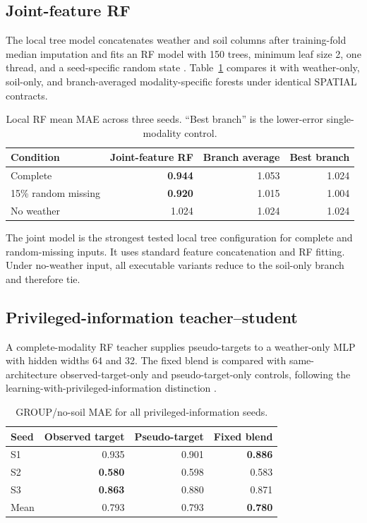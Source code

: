 \documentclass[runningheads]{venue/lncs/llncs}
\begin{document}
\subsection{Joint-feature RF}

The local tree model concatenates weather and soil columns after training-fold median imputation and fits an RF model with 150 trees, minimum leaf size 2, one thread, and a seed-specific random state \cite{Breiman2001RandomForests}. Table~\ref{tab:rf} compares it with weather-only, soil-only, and branch-averaged modality-specific forests under identical SPATIAL contracts.

\begin{table}[h]
\centering
\caption{Local RF mean MAE across three seeds. ``Best branch'' is the lower-error single-modality control.}
\label{tab:rf}
\small
\begin{tabular}{lrrr}
\toprule
Condition & Joint-feature RF & Branch average & Best branch\\
\midrule
Complete & \textbf{0.944} & 1.053 & 1.024\\
15\% random missing & \textbf{0.920} & 1.015 & 1.004\\
No weather & 1.024 & 1.024 & 1.024\\
\bottomrule
\end{tabular}
\end{table}

The joint model is the strongest tested local tree configuration for complete and random-missing inputs. It uses standard feature concatenation and RF fitting. Under no-weather input, all executable variants reduce to the soil-only branch and therefore tie.

\subsection{Privileged-information teacher--student}\label{sec:pi}

A complete-modality RF teacher supplies pseudo-targets to a weather-only MLP with hidden widths 64 and 32. The fixed blend is compared with same-architecture observed-target-only and pseudo-target-only controls, following the learning-with-privileged-information distinction \cite{LopezPaz2016GeneralizedDistillation}.

\begin{table}[h]
\centering
\caption{GROUP/no-soil MAE for all privileged-information seeds.}
\small
\begin{tabular}{lrrr}
\toprule
Seed & Observed target & Pseudo-target & Fixed blend\\
\midrule
S1 & 0.935 & 0.901 & \textbf{0.886}\\
S2 & \textbf{0.580} & 0.598 & 0.583\\
S3 & \textbf{0.863} & 0.880 & 0.871\\
\midrule
Mean & 0.793 & 0.793 & \textbf{0.780}\\
\bottomrule
\end{tabular}
\end{table}
\end{document}
